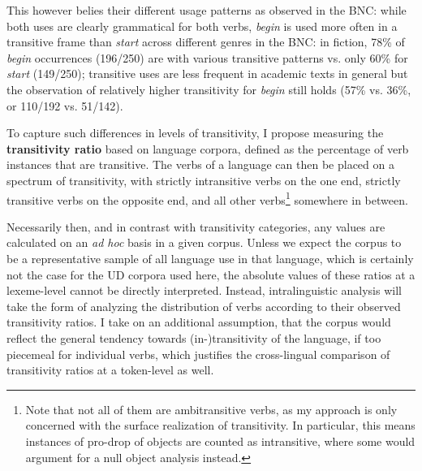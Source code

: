 \begin{exe}
\ex\label{example-begin_start}
  \begin{xlist}
  \end{xlist}
\end{exe}

This however belies their different usage patterns as observed in the BNC: while both uses are clearly grammatical for both verbs, \textit{begin} is used more often in a transitive frame than \textit{start} across different genres in the BNC: in fiction, 78\% of \textit{begin} occurrences (196/250) are with various transitive patterns vs. only 60\% for \textit{start} (149/250); transitive uses are less frequent in academic texts in general but the observation of relatively higher transitivity for \textit{begin} still holds (57\% vs. 36\%, or 110/192 vs. 51/142).

To capture such differences in levels of transitivity, I propose measuring the \textbf{transitivity ratio} based on language corpora, defined as the percentage of verb instances that are transitive. The verbs of a language can then be placed on a spectrum of transitivity, with strictly intransitive verbs on the one end, strictly transitive verbs on the opposite end, and all other verbs\footnote{Note that not all of them are ambitransitive verbs, as my approach is only concerned with the surface realization of transitivity. In particular, this means instances of pro-drop of objects are counted as intransitive, where some would argument for a null object analysis instead.} somewhere in between.

Necessarily then, and in contrast with transitivity categories, any values are calculated on an \textit{ad hoc} basis in a given corpus. Unless we expect the corpus to be a representative sample of all language use in that language, which is certainly not the case for the UD corpora used here, the absolute values of these ratios at a lexeme-level cannot be directly interpreted. Instead, intralinguistic analysis will take the form of analyzing the distribution of verbs according to their observed transitivity ratios. I take on an additional assumption, that the corpus would reflect the general tendency towards (in-)transitivity of the language, if too piecemeal for individual verbs, which justifies the cross-lingual comparison of transitivity ratios at a token-level as well.

